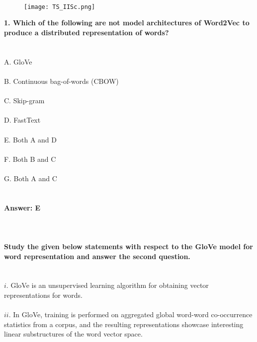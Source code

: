 \documentclass[prl,twocolumn,showpacs,preprintnumbers,superscriptaddress]{revtex4}
\theoremstyle{plain}
\theoremstyle{definition}
\begin{document}
\begin{widetext}
\\
\\
\\

\begin{wrapfigure}
\centering
\end{wrapfigure}
\begin{figure}[h!]
 \begin{right}
  \hfill\texttt{[image: TS\_IISc.png]}
 \end{right}
\end{figure}
\noindent\textbf{1. Which of the following are not model architectures of Word2Vec to produce a distributed representation of words?}
\\
\\
\\
A. GloVe
\\
\\
B. Continuous bag-of-words (CBOW)
\\
\\
C. Skip-gram
\\
\\
D. FastText
\\
\\
E. Both A and D
\\
\\
F. Both B and C
\\
\\
G. Both A and C
\\
\\
\\
\textbf{Answer: E}
\\
\\
\\
\\
\noindent\textbf{Study the given below statements with respect to the GloVe model for word representation and answer the second question.}
\\
\\
\\
$i.$ GloVe is an unsupervised learning algorithm for obtaining vector representations for words.
\\
\\
$ii.$ In GloVe, training is performed on aggregated global word-word co-occurrence statistics from a corpus, and the resulting representations showcase interesting linear substructures of the word vector space.

\end{widetext}
\end{document}
